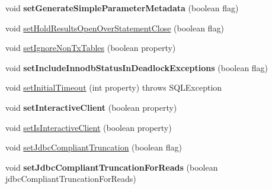 \begin{DoxyCompactItemize}
\item 
\mbox{\label{classcom_1_1mysql_1_1jdbc_1_1jdbc2_1_1optional_1_1_connection_wrapper_ac77602c962a4d6a48b75cb703e582d10}} 
void {\bfseries set\+Generate\+Simple\+Parameter\+Metadata} (boolean flag)
\item 
void \mbox{\hyperlink{classcom_1_1mysql_1_1jdbc_1_1jdbc2_1_1optional_1_1_connection_wrapper_a0b8d475aec95896806332ff84d251468}{set\+Hold\+Results\+Open\+Over\+Statement\+Close}} (boolean flag)
\item 
void \mbox{\hyperlink{classcom_1_1mysql_1_1jdbc_1_1jdbc2_1_1optional_1_1_connection_wrapper_a67f86e88b0cdc508024a59978cc255af}{set\+Ignore\+Non\+Tx\+Tables}} (boolean property)
\item 
\mbox{\label{classcom_1_1mysql_1_1jdbc_1_1jdbc2_1_1optional_1_1_connection_wrapper_a6172e66d9ce0deb0f2c8daf0ef0feec8}} 
void {\bfseries set\+Include\+Innodb\+Status\+In\+Deadlock\+Exceptions} (boolean flag)
\item 
void \mbox{\hyperlink{classcom_1_1mysql_1_1jdbc_1_1jdbc2_1_1optional_1_1_connection_wrapper_af88d96aed55dd2fdd401b0d86dcc700d}{set\+Initial\+Timeout}} (int property)  throws S\+Q\+L\+Exception 
\item 
\mbox{\label{classcom_1_1mysql_1_1jdbc_1_1jdbc2_1_1optional_1_1_connection_wrapper_a6d07f067ae76bfb901dcc361a87448e4}} 
void {\bfseries set\+Interactive\+Client} (boolean property)
\item 
void \mbox{\hyperlink{classcom_1_1mysql_1_1jdbc_1_1jdbc2_1_1optional_1_1_connection_wrapper_a62fdb1de695db692ac572889bc2299c8}{set\+Is\+Interactive\+Client}} (boolean property)
\item 
void \mbox{\hyperlink{classcom_1_1mysql_1_1jdbc_1_1jdbc2_1_1optional_1_1_connection_wrapper_ac6acbc9e9f58e73211256f68e7f36a9a}{set\+Jdbc\+Compliant\+Truncation}} (boolean flag)
\item 
\mbox{\label{classcom_1_1mysql_1_1jdbc_1_1jdbc2_1_1optional_1_1_connection_wrapper_a26121a0d49f6a947c5151d8d075d6299}} 
void {\bfseries set\+Jdbc\+Compliant\+Truncation\+For\+Reads} (boolean jdbc\+Compliant\+Truncation\+For\+Reads)

\end{DoxyCompactItemize}
